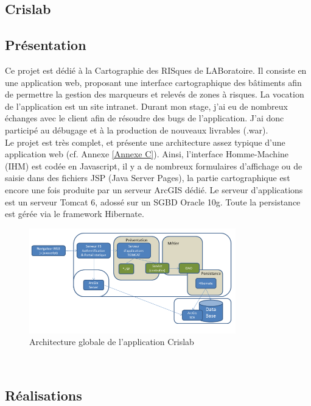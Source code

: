 \begin{itemize}
\section{Crislab}\label{Divers}

\subsection{Présentation} 

Ce projet est dédié à la Cartographie des RISques de LABoratoire. Il consiste en une application web, proposant une interface cartographique des bâtiments afin de permettre la gestion des marqueurs et relevés de zones à risques. La vocation de l'application est un site intranet. Durant mon stage, j'ai eu de nombreux échanges avec le client afin de résoudre des bugs de l'application. J'ai donc participé au débugage et à la production de nouveaux livrables (.war).\\

Le projet est très complet, et présente une architecture assez typique d'une application web (cf. Annexe \ref{Annexe C}). Ainsi, l'interface Homme-Machine (IHM) est codée en Javascript, il y a de nombreux formulaires d'affichage ou de saisie dans des fichiers JSP  (Java Server Pages), la partie cartographique est encore une fois produite par un serveur ArcGIS dédié. Le serveur d'applications est un serveur Tomcat 6, adossé sur un SGBD Oracle 10g. Toute la persistance est gérée via le framework Hibernate.\\

\begin{figure}[h]
	\centering
		\includegraphics[width=0.8\textwidth]{images/Architecture_Crislab.PNG}
	\caption{Architecture globale de l'application Crislab}
	\label{fig:architecture}
\end{figure}\\


\subsection{Réalisations}


\end{itemize}
